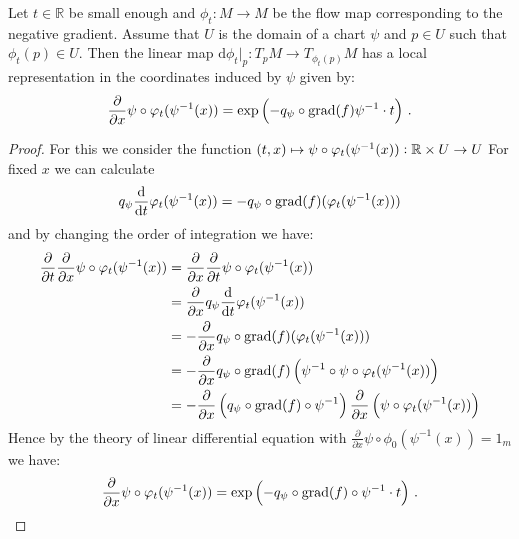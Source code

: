 \begin{lemma}
	Let $t\in \mathbb{R}$ be small enough and $\phi_t: M\to M$ be the flow map corresponding to the negative gradient. Assume that $U$ is the domain of a chart $\psi$ and $p\in U$ such that $\phi_t(p)\in U$. Then the linear map $\mathrm{d} \phi_t \big|_p: T_pM\to T_{\phi_t(p)}M$ has a local representation in the coordinates induced by $\psi$ given by:
	\[
\frac{\partial}{\partial x} \psi \circ \varphi_t(\psi^{-1}(x))=\exp\left(- q_{\psi} \circ \mathrm{grad}(f)\psi^{-1} \cdot t \right) \, .
	\]
\end{lemma}
\begin{proof}
For this we consider the function $ (t,x)\mapsto \psi \circ  \varphi_t(\psi^{-1}(x)):\mathbb{R} \times U \to U$ For fixed $x$ we can calculate
\begin{align*}
	q_{\psi}\frac{\mathop{}\!\mathrm{d}}{\mathop{}\!\mathrm{d} t} \varphi_t(\psi^{-1}(x))=-q_{\psi} \circ \mathrm{grad}(f)(\varphi_t(\psi^{-1}(x)))
\end{align*} and by changing the order of integration we have:
\begin{align*}
	\frac{\partial}{\partial t}   \frac{\partial}{\partial x} \psi \circ \varphi_t(\psi^{-1}(x))
	&= \frac{\partial}{\partial x}   \frac{\partial}{\partial t} \psi \circ \varphi_t(\psi^{-1}(x))\\
	&= \frac{\partial}{\partial x} q_\psi \frac{\mathop{}\!\mathrm{d} }{\mathop{}\!\mathrm{d} t}  \varphi_t(\psi^{-1}(x))  \\
	&= -\frac{\partial}{\partial x} q_{\psi} \circ \mathrm{grad}(f)(\varphi_t(\psi^{-1}(x)))	\\
	&= -\frac{\partial}{\partial x} q_{\psi} \circ \mathrm{grad}(f)\left(\psi^{-1}\circ \psi\circ \varphi_t(\psi^{-1}(x))\right)\\
	&=-\frac{\partial}{\partial x} \left( q_{\psi} \circ \mathrm{grad}(f)\circ \psi^{-1} \right)\frac{\partial }{\partial x}  \left(\psi\circ \varphi_t(\psi^{-1}(x))\right)
\end{align*}
Hence by the theory of linear differential equation with $\frac{\partial}{\partial x} \psi \circ \phi_0(\psi^{-1}(x))=1_m$ we have:
\begin{align*}
	\frac{\partial}{\partial x} \psi \circ \varphi_t(\psi^{-1}(x))=\exp\left(- q_{\psi} \circ \mathrm{grad}(f)\circ \psi^{-1}\cdot t \right) \, .
\end{align*}
\begin{comment}
\begin{align*}
		q_{\psi}	\frac{\partial}{\partial x} \phi_t(\psi^{-1}(x))=\exp\left( q_{\psi} \circ \grad(f)\psi^{-1} \right) \, .
	\end{align*}
\end{comment}

\end{proof}













